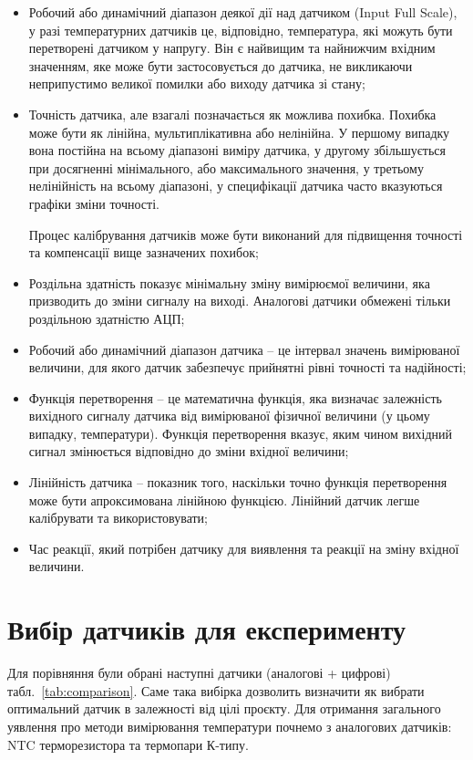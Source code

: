 \begin{itemize}
    \item Робочий або динамічний діапазон деякої дії над датчиком (Input Full Scale), у разі температурних датчиків це, відповідно, температура, які можуть бути перетворені датчиком у напругу. Він є найвищим та найнижчим вхідним значенням, яке може бути застосовується до датчика, не викликаючи неприпустимо великої помилки або виходу датчика зі стану;
    \item Точність датчика, але взагалі позначається як можлива похибка. Похибка може бути як лінійна, мультиплікативна або нелінійна. У першому випадку вона постійна на всьому діапазоні виміру датчика, у другому збільшується при досягненні мінімального, або максимального значення, у третьому нелінійність на всьому діапазоні, у специфікації датчика часто вказуються графіки зміни точності.

    Процес калібрування датчиків може бути виконаний для підвищення точності та компенсації вище зазначених похибок;
    \item Роздільна здатність показує мінімальну зміну вимірюємої величини, яка призводить до зміни сигналу на виході. Аналогові датчики обмежені тільки роздільною здатністю АЦП;
    \item Робочий або динамічний діапазон датчика -- це інтервал значень вимірюваної величини, для якого датчик забезпечує прийнятні рівні точності та надійності;
    \item Функція перетворення -- це математична функція, яка визначає залежність вихідного сигналу датчика від вимірюваної фізичної величини (у цьому випадку, температури). Функція перетворення вказує, яким чином вихідний сигнал змінюється відповідно до зміни вхідної величини;
    \item Лінійність датчика -- показник того, наскільки точно функція перетворення може бути апроксимована лінійною функцією. Лінійний датчик легше калібрувати та використовувати;
    \item Час реакції, який потрібен датчику для виявлення та реакції на зміну вхідної величини.\\
\end{itemize}

\section{Вибір датчиків для експерименту}

Для порівняння були обрані наступні датчики (аналогові + цифрові) табл.~\ref{tab:comparison}. Саме така вибірка дозволить визначити як вибрати оптимальний датчик в залежності від цілі проєкту. Для отримання загального уявлення про методи вимірювання температури почнемо з аналогових датчиків: NTC терморезистора та термопари К-типу.

